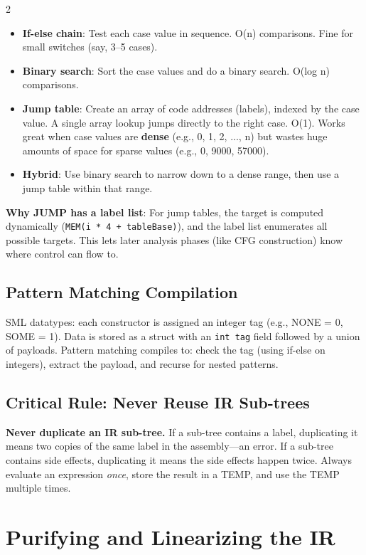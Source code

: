 \documentclass[9pt,landscape]{extarticle}
\begin{document}
\begin{multicols}{2}
\begin{itemize}
  \item \textbf{If-else chain}: Test each case value in sequence. O(n) comparisons. Fine for small switches (say, 3--5 cases).
  \item \textbf{Binary search}: Sort the case values and do a binary search. O(log n) comparisons.
  \item \textbf{Jump table}: Create an array of code addresses (labels), indexed by the case value. A single array lookup jumps directly to the right case. O(1). Works great when case values are \textbf{dense} (e.g., 0, 1, 2, ..., n) but wastes huge amounts of space for sparse values (e.g., 0, 9000, 57000).
  \item \textbf{Hybrid}: Use binary search to narrow down to a dense range, then use a jump table within that range.
\end{itemize}

\textbf{Why JUMP has a label list}: For jump tables, the target is computed dynamically (\texttt{MEM(i * 4 + tableBase)}), and the label list enumerates all possible targets. This lets later analysis phases (like CFG construction) know where control can flow to.

\subsection{Pattern Matching Compilation}

SML datatypes: each constructor is assigned an integer tag (e.g., NONE = 0, SOME = 1). Data is stored as a struct with an \texttt{int tag} field followed by a union of payloads. Pattern matching compiles to: check the tag (using if-else on integers), extract the payload, and recurse for nested patterns.

\subsection{Critical Rule: Never Reuse IR Sub-trees}

\textbf{Never duplicate an IR sub-tree.} If a sub-tree contains a label, duplicating it means two copies of the same label in the assembly---an error. If a sub-tree contains side effects, duplicating it means the side effects happen twice. Always evaluate an expression \emph{once}, store the result in a TEMP, and use the TEMP multiple times.

\section{Purifying and Linearizing the IR}


\end{multicols}
\end{document}
